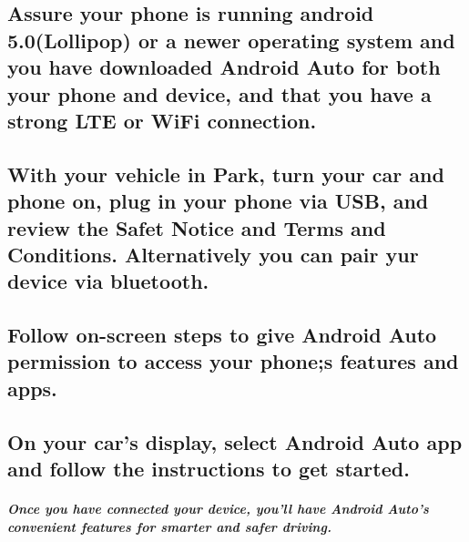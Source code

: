 \documentclass[a4paper, 12pt]{article}
\begin{document}
\subsection{Assure your phone is running android 5.0(Lollipop) or a newer operating system and you have downloaded Android Auto for both your phone and device, and that you have a strong LTE or WiFi connection.}
\subsection{With your vehicle in Park, turn your car and phone on, plug in your phone via USB, and review the Safet Notice and Terms and Conditions. Alternatively you can pair yur device via bluetooth.}
\subsection{Follow on-screen steps to give Android Auto permission to access your phone;s features and apps.}
\subsection{On your car's display, select Android Auto app and follow the instructions to get started.}
\subparagraph{Once you have connected your device, you'll have Android Auto's convenient features for smarter and safer driving.}
\end{document}
